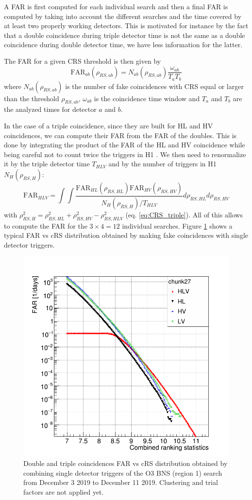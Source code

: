 A FAR is first computed for each individual search and then a final FAR is computed by taking into account the different searches and the time covered by at least two properly working detectors.
This is motivated for instance by the fact that a double coincidence during triple detector time is not the same as a double coincidence during double detector time, we have less information for the latter.

The FAR for a given CRS threshold is then given by
%
\begin{equation}
  \textrm{FAR}_{ab}(\rho_{RS,ab}) = N_{ab}(\rho_{RS,ab}) \frac{\omega_{ab}}{T_a T_b}
  \label{eq:FAR_double}
\end{equation}
%
where $N_{ab}(\rho_{RS,ab})$ is the number of fake coincidences with CRS equal or larger than the threshold $\rho_{RS,ab}$, $\omega_{ab}$ is the coincidence time window and $T_a$ and $T_b$ are the analyzed times for detector $a$ and $b$.

In the case of a triple coincidence, since they are built for HL and HV coincidences, we can compute their FAR from the FAR of the doubles.
This is done by integrating the product of the FAR of the HL and HV coincidence while being careful not to count twice the triggers in H1 .
We then need to renormalize it by the triple detector time $T_{HLV}$ and by the number of triggers in H1 $N_H(\rho_{RS,H})$:
%
\begin{equation}
  \textrm{FAR}_{HLV} = \int\int \frac{ \textrm{FAR}_{HL}(\rho_{RS,HL}) \textrm{FAR}_{HV}(\rho_{RS,HV}) }{N_H(\rho_{RS,H})/T_{HLV}} d\rho_{RS,HL}d\rho_{RS,HV}
  \label{eq:FAR_triple}
\end{equation}
%
with $\rho^2_{RS,H} = \rho^2_{RS,HL} + \rho^2_{RS,HV} - \rho^2_{RS,HLV}$ (eq. \ref{eq:CRS_triple}).
All of this allows to compute the FAR for the $3 \times 4 = 12$ individual searches.
Figure \ref{fig:far_crs} shows a typical FAR vs cRS distribution obtained by making fake coincidences with single detector triggers.

\begin{figure}[ht]
  \centering
  \includegraphics[width=0.5\linewidth]{BNSFARcRank_chunk27.png}
  \caption{Double and triple coincidences FAR vs cRS distribution obtained by combining single detector triggers of the O3 BNS (region 1) search from December 3 2019 to December 11 2019. Clustering and trial factors are not applied yet.}
  \label{fig:far_crs}
\end{figure}

